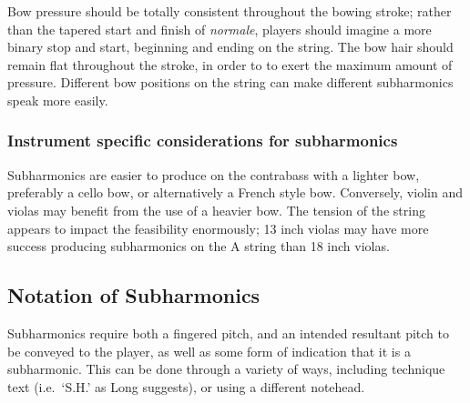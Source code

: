 Bow pressure should be totally consistent throughout the bowing stroke; rather than the tapered start and finish of \emph{normale}, players should imagine a more binary stop and start, beginning and ending on the string.
The bow hair should remain flat throughout the stroke, in order to to exert the maximum amount of pressure.\autocite[]{kimuraHowProduceSubharmonics1999}
Different bow positions on the string can make different subharmonics speak more easily.\autocite[]{kimuraHowProduceSubharmonics1999}

\subsubsection{Instrument specific considerations for subharmonics}
Subharmonics are easier to produce on the contrabass with a lighter bow, preferably a cello bow, or alternatively a French style bow.\autocite[]{longSubharmonics2019}
Conversely, violin and violas may benefit from the use of a heavier bow.\autocite[]{appleseedFeedbackSightreadingSession2019}
The tension of the string appears to impact the feasibility enormously; 13 inch violas may have more success producing subharmonics on the A string than 18 inch violas.\autocite[]{appleseedFeedbackSightreadingSession2019}



\subsection{Notation of Subharmonics}\label{sec:notation-subharmonics}
Subharmonics require both a fingered pitch, and an intended resultant pitch to be conveyed to the player, as well as some form of indication that it is a subharmonic.
This can be done through a variety of ways, including technique text (i.e.\ `S.H.' as Long suggests), or using a different notehead.\autocite[]{longSubharmonics2019}

